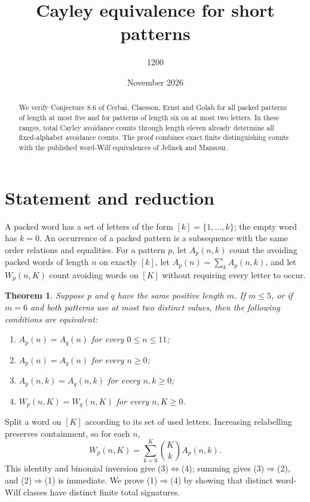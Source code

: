 \documentclass[10pt]{article}
\title{\textbf{Cayley equivalence for short patterns}}
\author{1200}
\date{November 2026}
\newtheorem{theorem}{Theorem}
\begin{document}
\maketitle
\begin{abstract}
We verify Conjecture 8.6 of Cerbai, Claesson, Ernst and Golab for all packed
patterns of length at most five and for patterns of length six on at most
two letters. In these ranges, total Cayley avoidance counts through length
eleven already determine all fixed-alphabet avoidance counts. The proof
combines exact finite distinguishing counts with the published word-Wilf
equivalences of Jel\'{\i}nek and Mansour.
\end{abstract}

\section{Statement and reduction}
A packed word has a set of letters of the form $[k]=\{1,\ldots,k\}$;
the empty word has $k=0$. An occurrence of a packed pattern is a subsequence
with the same order relations and equalities. For a pattern $p$, let
$A_p(n,k)$ count the avoiding packed words of length $n$ on exactly $[k]$,
let $A_p(n)=\sum_k A_p(n,k)$, and let $W_p(n,K)$ count avoiding words on
$[K]$ without requiring every letter to occur.

\begin{theorem}
Suppose $p$ and $q$ have the same positive length $m$. If $m\le5$, or if
$m=6$ and both patterns use at most two distinct values, then the
following conditions are equivalent:
\begin{enumerate}
\setlength{\itemsep}{.14em}
\item $A_p(n)=A_q(n)$ for every $0\le n\le11$;
\item $A_p(n)=A_q(n)$ for every $n\ge0$;
\item $A_p(n,k)=A_q(n,k)$ for every $n,k\ge0$;
\item $W_p(n,K)=W_q(n,K)$ for every $n,K\ge0$.
\end{enumerate}
\end{theorem}

Split a word on $[K]$ according to its set of used letters. Increasing
relabelling preserves containment, so for each $n$,
\[
 W_p(n,K)=\sum_{k=0}^K \binom Kk A_p(n,k).
\]
This identity and binomial inversion give (3)$\Leftrightarrow$(4);
summing gives (3)$\Rightarrow$(2), and (2)$\Rightarrow$(1) is immediate.
We prove (1)$\Rightarrow$(4) by showing that distinct word-Wilf classes
have distinct finite total signatures.
\end{document}
